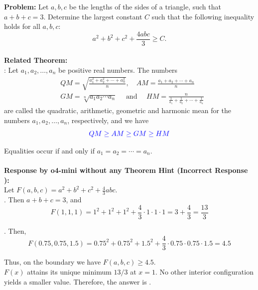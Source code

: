 \begin{examplebox}
\textbf{Problem:} Let $a, b, c$ be the lengths of the sides of a triangle, such that $a + b + c = 3$. Determine the largest constant $C$ such that the following inequality holds for all $a, b, c$:
$$
a^{2} + b^{2} + c^{2} + \frac{4 a b c}{3} \geq C.
$$
\\
\textbf{Related Theorem:}\\ 
: Let $a_{1}, a_{2}, \ldots, a_{n}$ be positive real numbers. The numbers
$$
\begin{aligned}
& Q M=\sqrt{\frac{a_{1}^{2}+a_{2}^{2}+\cdots+a_{n}^{2}}{n}}, \quad A M=\frac{a_{1}+a_{2}+\cdots+a_{n}}{n} \\
& G M=\sqrt[n]{a_{1} a_{2} \cdots a_{n}} \quad \text { and } \quad H M=\frac{n}{\frac{1}{a_{1}}+\frac{1}{a_{2}}+\cdots+\frac{1}{a_{n}}}
\end{aligned}
$$
are called the quadratic, arithmetic, geometric and harmonic mean for the numbers $a_{1}, a_{2}, \ldots, a_{n}$, respectively, and we have
$$
{\textcolor{blue}{Q M \geq A M \geq G M \geq H M}}
$$

Equalities occur if and only if $a_{1}=a_{2}=\cdots=a_{n}$.
\\\\
\textbf{Response by o4-mini without any Theorem Hint (Incorrect Response \xmark):}\\
Let $F(a, b, c) = a^2 + b^2 + c^2 + \frac{4}{3}abc$.\\
. Then \( a + b + c = 3 \), and
\[
F(1,1,1) = 1^2 + 1^2 + 1^2 + \frac{4}{3} \cdot 1 \cdot 1 \cdot 1 = 3 + \frac{4}{3} = \frac{13}{3}
\]

. Then,
\[
F(0.75, 0.75, 1.5) = 0.75^2 + 0.75^2 + 1.5^2 + \frac{4}{3} \cdot 0.75 \cdot 0.75 \cdot 1.5 = 4.5
\]

Thus, on the boundary we have \( F(a,b,c) \geq 4.5 \).\\

 \( F(x) \) attains its unique minimum \( 13/3 \) at \( x = 1 \). No other interior configuration yields a smaller value. Therefore, the answer is .
\\



\end{examplebox}
